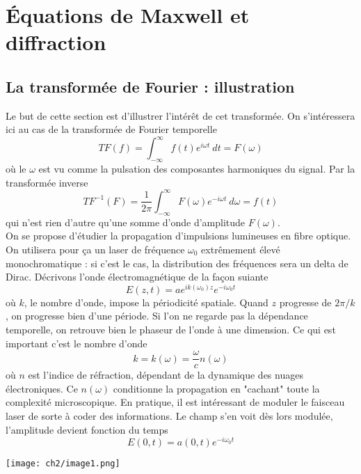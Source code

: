 \chapter{Équations de Maxwell et diffraction}
\section{La transformée de Fourier : illustration}
Le but de cette section est d'illustrer l'intérêt de cet transformée. On s'intéressera 
ici au cas de la transformée de Fourier temporelle
\begin{equation}
TF(f) = \int_{-\infty}^\infty f(t)e^{i\omega t}\ dt = F(\omega)
\end{equation}
où le $\omega$ est vu comme la pulsation des composantes harmoniques du signal. Par la 
transformée inverse
\begin{equation}
TF^{-1}(F) = \dfrac{1}{2\pi}\int_{-\infty}^\infty F(\omega)e^{-i\omega t }\ d\omega = f(t)
\end{equation}
qui n'est rien d'autre qu'une somme d'onde d'amplitude $F(\omega)$.\\

On se propose d'étudier la propagation d'impulsions lumineuses en fibre optique. On utilisera 
pour ça un laser de fréquence $\omega_0$ extrêmement élevé monochromatique : si c'est le cas, 
la distribution des fréquences sera un delta de Dirac. Décrivons l'onde électromagnétique de 
la façon suiante
\begin{equation}
E(z,t) = ae^{ik(\omega_0)z}e^{-i\omega_0t}
\end{equation}
où $k$, le nombre d'onde, impose la périodicité spatiale. Quand $z$ progresse de $2\pi/k$, on 
progresse bien d'une période. Si l'on ne regarde pas la dépendance temporelle, on retrouve bien 
le phaseur de l'onde à une dimension. Ce qui est important c'est le nombre d'onde
\begin{equation}
k = k(\omega) = \frac{\omega}{c}n(\omega)
\end{equation}
où $n$ est l'indice de réfraction, dépendant de la dynamique des nuages électroniques. Ce $n
(\omega)$ conditionne la propagation en "cachant" toute la complexité microscopique. En pratique, 
il est intéressant de moduler le faisceau laser de sorte à coder des informations. Le champ 
s'en voit dès lors modulée, l'amplitude devient fonction du temps
\begin{equation}
E(0,t) = a(0,t)e^{-i\omega_0t}
\end{equation}
\begin{center}
\texttt{[image: ch2/image1.png]}
\end{center}

